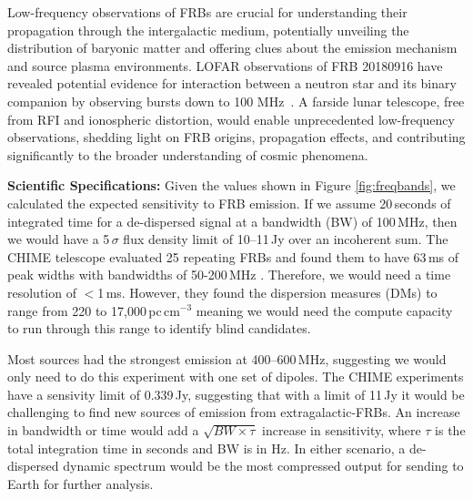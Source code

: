 Low-frequency observations of FRBs are crucial for understanding their propagation through the intergalactic medium, potentially unveiling the distribution of baryonic matter and offering clues about the emission mechanism and source plasma environments. LOFAR observations of FRB 20180916 have revealed potential evidence for interaction between a neutron star and its binary companion by observing bursts down to 100 MHz~\citep{pleunis2021lofar}. A farside lunar telescope, free from RFI and ionospheric distortion, would enable unprecedented low-frequency observations, shedding light on FRB origins, propagation effects, and contributing significantly to the broader understanding of cosmic phenomena.

\textbf{Scientific Specifications:} Given the values shown in Figure \ref{fig:freqbands}, we calculated the expected sensitivity to FRB emission. If we assume 20\,seconds of integrated time for a de-dispersed signal at a bandwidth (BW) of 100\,MHz, then we would have a 5\,$\sigma$ flux density limit of 10--11\,Jy over an incoherent sum. The CHIME telescope evaluated 25 repeating FRBs and found them to have 63\,ms of peak widths with bandwidths of 50-200\,MHz \citep{CHIME_RepeatingFRB}. Therefore, we would need a time resolution of $<$1\,ms. However, they found the dispersion measures (DMs) to range from 220 to 17,000\,pc\,cm$^{-3}$ meaning we would need the compute capacity to run through this range to identify blind candidates. 

Most sources had the strongest emission at 400--600\,MHz, suggesting we would only need to do this experiment with one set of dipoles. The CHIME experiments have a sensivity limit of 0.339\,Jy, suggesting that with a limit of 11\,Jy it would be challenging to find new sources of emission from extragalactic-FRBs. An increase in bandwidth or time would add a $\sqrt{BW\times\tau}$ increase in sensitivity, where $\tau$ is the total integration time in seconds and BW is in Hz. In either scenario, a de-dispersed dynamic spectrum would be the most compressed output for sending to Earth for further analysis.





